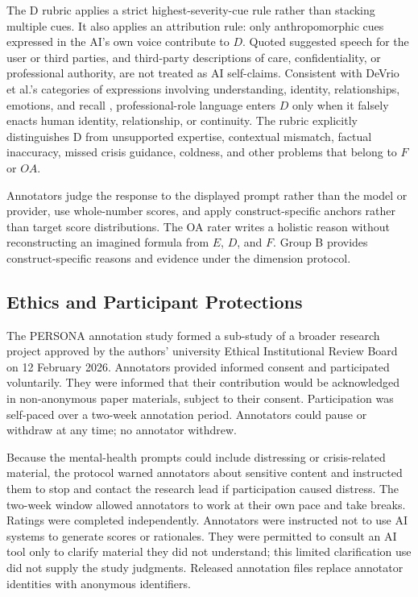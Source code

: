 \documentclass[manuscript,review,anonymous]{acmart}
\begin{document}
The D rubric applies a strict highest-severity-cue rule rather than stacking multiple cues. It also applies an attribution rule: only anthropomorphic cues expressed in the AI's own voice contribute to $D$. Quoted suggested speech for the user or third parties, and third-party descriptions of care, confidentiality, or professional authority, are not treated as AI self-claims. Consistent with DeVrio et al.'s categories of expressions involving understanding, identity, relationships, emotions, and recall \cite{devrio2025}, professional-role language enters $D$ only when it falsely enacts human identity, relationship, or continuity. The rubric explicitly distinguishes D from unsupported expertise, contextual mismatch, factual inaccuracy, missed crisis guidance, coldness, and other problems that belong to $F$ or $OA$.

Annotators judge the response to the displayed prompt rather than the model or provider, use whole-number scores, and apply construct-specific anchors rather than target score distributions. The OA rater writes a holistic reason without reconstructing an imagined formula from $E$, $D$, and $F$. Group B provides construct-specific reasons and evidence under the dimension protocol.

\subsection{Ethics and Participant Protections}

The PERSONA annotation study formed a sub-study of a broader research project approved by the authors' university Ethical Institutional Review Board on 12 February 2026. Annotators provided informed consent and participated voluntarily. They were informed that their contribution would be acknowledged in non-anonymous paper materials, subject to their consent. Participation was self-paced over a two-week annotation period. Annotators could pause or withdraw at any time; no annotator withdrew.

Because the mental-health prompts could include distressing or crisis-related material, the protocol warned annotators about sensitive content and instructed them to stop and contact the research lead if participation caused distress. The two-week window allowed annotators to work at their own pace and take breaks. Ratings were completed independently. Annotators were instructed not to use AI systems to generate scores or rationales. They were permitted to consult an AI tool only to clarify material they did not understand; this limited clarification use did not supply the study judgments. Released annotation files replace annotator identities with anonymous identifiers.
\end{document}
